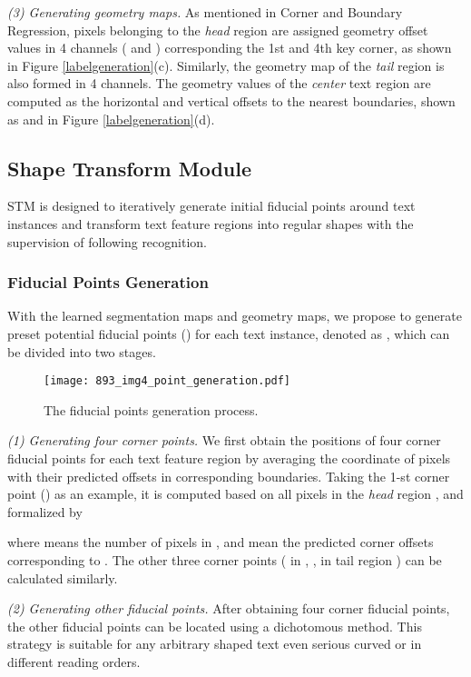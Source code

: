 \documentclass[letterpaper]{article} \usepackage{aaai20}  \usepackage{times}  \usepackage{helvet} \usepackage{courier}  \usepackage[hyphens]{url}  \usepackage{graphicx} \urlstyle{rm} \def\UrlFont{\rm}  \usepackage{graphicx}  \frenchspacing  \setlength{\pdfpagewidth}{8.5in}  \setlength{\pdfpageheight}{11in}  \usepackage{amsmath}
\begin{document}
\emph{(3) Generating geometry maps.}
As mentioned in  Corner and Boundary Regression, pixels belonging to the \emph{head} region are assigned geometry offset values in 4 channels ( and ) corresponding the 1st and 4th key corner, as shown in Figure \ref{labelgeneration}(c).
Similarly, the geometry map of the \emph{tail} region is also formed in 4 channels.
The geometry values of the \emph{center} text region are computed as the horizontal and vertical offsets to the nearest boundaries, shown as  and  in Figure \ref{labelgeneration}(d).

\subsection{Shape Transform Module}
STM is designed to iteratively generate initial fiducial points around text instances and transform text feature regions into regular shapes with the supervision of following recognition.
\subsubsection{Fiducial Points Generation}
With the learned segmentation maps and geometry maps, we propose to generate preset  potential fiducial points () for each text instance, denoted as , which can be divided into two stages.
\begin{figure}
\centering
\texttt{[image: 893\_img4\_point\_generation.pdf]}\\
\caption{The fiducial points generation process.}
\label{fig:fiducial-points}
\end{figure}

\emph{(1) Generating four corner points.}
We first obtain the positions of four corner fiducial points for each text feature region by averaging the coordinate of pixels with their predicted offsets in corresponding boundaries.
Taking the 1-st corner point () as an example, it is computed based on all pixels in the \emph{head} region , and formalized by

where  means the number of pixels in , and  mean the predicted corner offsets corresponding to .
The other three corner points ( in , ,  in tail region ) can be calculated similarly.

\emph{(2) Generating other fiducial points.}
After obtaining four corner fiducial points, the other fiducial points can be located using a dichotomous method.
This strategy is suitable for any arbitrary shaped text even serious curved or in different reading orders.
\end{document}
